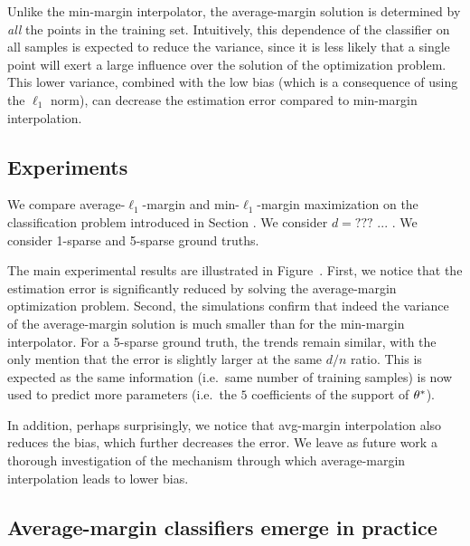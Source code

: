 Unlike the min-margin interpolator, the average-margin solution is determined
by \emph{all} the points in the training set. Intuitively, this dependence of
the classifier on all samples is expected to reduce the variance, since it is
less likely that a single point will exert a large influence over the solution
of the optimization problem. This lower variance, combined with the low bias
(which is a consequence of using the $\ell_1$ norm), can decrease the estimation
error compared to min-margin interpolation.

\subsection{Experiments}

We compare average-$\ell_1$-margin and min-$\ell_1$-margin maximization on the
classification problem introduced in Section . We consider $d=???$ ...
. We consider 1-sparse and 5-sparse ground truths.

The main experimental results are illustrated in Figure~. First, we
notice that the estimation error is significantly reduced by solving the
average-margin optimization problem. Second, the simulations confirm that indeed
the variance of the average-margin solution is much smaller than for the
min-margin interpolator. For a 5-sparse ground truth, the trends remain similar,
with the only mention that the error is slightly larger at the
same $d/n$ ratio. This is expected as the same information (i.e.\ same number of
training samples) is now used to predict more parameters (i.e.\ the $5$
coefficients of the support of $\theta^*$).

In addition, perhaps surprisingly, we notice that avg-margin interpolation also
reduces the bias, which further decreases the error. We leave as future work a
thorough investigation of the mechanism through which average-margin
interpolation leads to lower bias.

\subsection{Average-margin classifiers emerge in practice}

